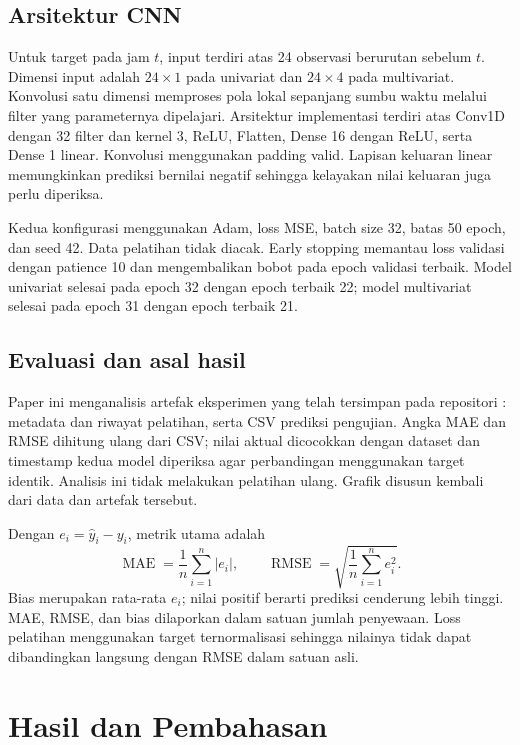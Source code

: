 \documentclass[10pt,conference]{IEEEtran}
\begin{document}
\subsection{Arsitektur CNN}
Untuk target pada jam $t$, input terdiri atas 24 observasi berurutan sebelum $t$. Dimensi input adalah $24\times1$ pada univariat dan $24\times4$ pada multivariat. Konvolusi satu dimensi memproses pola lokal sepanjang sumbu waktu melalui filter yang parameternya dipelajari. Arsitektur implementasi terdiri atas Conv1D dengan 32 filter dan kernel 3, ReLU, Flatten, Dense 16 dengan ReLU, serta Dense 1 linear. Konvolusi menggunakan padding valid. Lapisan keluaran linear memungkinkan prediksi bernilai negatif sehingga kelayakan nilai keluaran juga perlu diperiksa.

Kedua konfigurasi menggunakan Adam, loss MSE, batch size 32, batas 50 epoch, dan seed 42. Data pelatihan tidak diacak. Early stopping memantau loss validasi dengan patience 10 dan mengembalikan bobot pada epoch validasi terbaik. Model univariat selesai pada epoch 32 dengan epoch terbaik 22; model multivariat selesai pada epoch 31 dengan epoch terbaik 21.

\subsection{Evaluasi dan asal hasil}
Paper ini menganalisis artefak eksperimen yang telah tersimpan pada repositori \cite{repo}: metadata dan riwayat pelatihan, serta CSV prediksi pengujian. Angka MAE dan RMSE dihitung ulang dari CSV; nilai aktual dicocokkan dengan dataset dan timestamp kedua model diperiksa agar perbandingan menggunakan target identik. Analisis ini tidak melakukan pelatihan ulang. Grafik disusun kembali dari data dan artefak tersebut.

Dengan $e_i=\hat y_i-y_i$, metrik utama adalah
\begin{equation}
\operatorname{MAE}=\frac{1}{n}\sum_{i=1}^{n}|e_i|,\qquad
\operatorname{RMSE}=\sqrt{\frac{1}{n}\sum_{i=1}^{n}e_i^2}.
\end{equation}
Bias merupakan rata-rata $e_i$; nilai positif berarti prediksi cenderung lebih tinggi. MAE, RMSE, dan bias dilaporkan dalam satuan jumlah penyewaan. Loss pelatihan menggunakan target ternormalisasi sehingga nilainya tidak dapat dibandingkan langsung dengan RMSE dalam satuan asli.

\section{Hasil dan Pembahasan}
\end{document}
